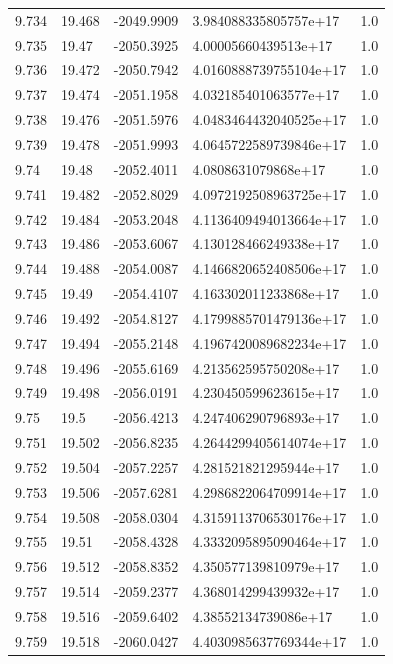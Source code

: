 \begin{tabular}{lllll}
9.734 & 19.468 & -2049.9909 & 3.984088335805757e+17 & 1.0 \\
9.735 & 19.47 & -2050.3925 & 4.00005660439513e+17 & 1.0 \\
9.736 & 19.472 & -2050.7942 & 4.0160888739755104e+17 & 1.0 \\
9.737 & 19.474 & -2051.1958 & 4.032185401063577e+17 & 1.0 \\
9.738 & 19.476 & -2051.5976 & 4.0483464432040525e+17 & 1.0 \\
9.739 & 19.478 & -2051.9993 & 4.0645722589739846e+17 & 1.0 \\
9.74 & 19.48 & -2052.4011 & 4.0808631079868e+17 & 1.0 \\
9.741 & 19.482 & -2052.8029 & 4.0972192508963725e+17 & 1.0 \\
9.742 & 19.484 & -2053.2048 & 4.1136409494013664e+17 & 1.0 \\
9.743 & 19.486 & -2053.6067 & 4.130128466249338e+17 & 1.0 \\
9.744 & 19.488 & -2054.0087 & 4.1466820652408506e+17 & 1.0 \\
9.745 & 19.49 & -2054.4107 & 4.163302011233868e+17 & 1.0 \\
9.746 & 19.492 & -2054.8127 & 4.1799885701479136e+17 & 1.0 \\
9.747 & 19.494 & -2055.2148 & 4.1967420089682234e+17 & 1.0 \\
9.748 & 19.496 & -2055.6169 & 4.213562595750208e+17 & 1.0 \\
9.749 & 19.498 & -2056.0191 & 4.230450599623615e+17 & 1.0 \\
9.75 & 19.5 & -2056.4213 & 4.247406290796893e+17 & 1.0 \\
9.751 & 19.502 & -2056.8235 & 4.2644299405614074e+17 & 1.0 \\
9.752 & 19.504 & -2057.2257 & 4.281521821295944e+17 & 1.0 \\
9.753 & 19.506 & -2057.6281 & 4.2986822064709914e+17 & 1.0 \\
9.754 & 19.508 & -2058.0304 & 4.3159113706530176e+17 & 1.0 \\
9.755 & 19.51 & -2058.4328 & 4.3332095895090464e+17 & 1.0 \\
9.756 & 19.512 & -2058.8352 & 4.350577139810979e+17 & 1.0 \\
9.757 & 19.514 & -2059.2377 & 4.368014299439932e+17 & 1.0 \\
9.758 & 19.516 & -2059.6402 & 4.38552134739086e+17 & 1.0 \\
9.759 & 19.518 & -2060.0427 & 4.4030985637769344e+17 & 1.0 \\

\end{tabular}
